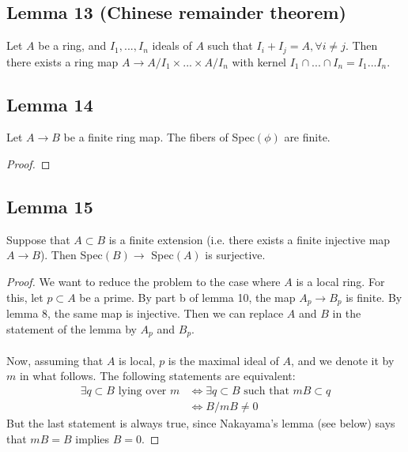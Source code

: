 \documentclass[12 pt]{article}
\begin{document}
\subsection*{Lemma 13 (Chinese remainder theorem)}
Let $A$ be a ring, and $I_1, ... , I_n$ ideals of $A$ such that $I_i + I_j = A , \forall i\neq j$. Then there exists a ring map $A \to A/I_1 \times ... \times A/I_n$ with kernel $I_1 \cap ... \cap I_n = I_1 ... I_n$.

\subsection*{Lemma 14}
Let $A \rightarrow B$ be a finite ring map. The fibers of Spec$(\phi)$ are finite.
\begin{proof}

\end{proof}

\subsection*{Lemma 15} 
Suppose that $A\subset B$ is a finite extension (i.e. there exists a finite injective map $A\to B$). Then Spec$(B) \to $ Spec$(A)$ is surjective.
\begin{proof}
We want to reduce the problem to the case where $A$ is a local ring. For this, let $p\subset A$ be a prime. By part b of lemma 10, the map $A_p \to B_p$ is finite. By lemma 8, the same map is injective. Then we can replace $A$ and $B$ in the statement of the lemma by $A_p$ and $B_p$.
\\
\\
Now, assuming that $A$ is local, $p$ is the maximal ideal of $A$, and we denote it by $m$ in what follows. The following statements are equivalent:
\begin{align*}
 \exists q \subset B \text{ lying over } m &\Leftrightarrow \exists q\subset B \text{ such that } mB \subset q
 \\   & \Leftrightarrow B/mB \neq 0
\end{align*}
But the last statement is always true, since Nakayama's lemma (see below) says that $mB = B$ implies $B = 0$.
\end{proof}
\end{document}
